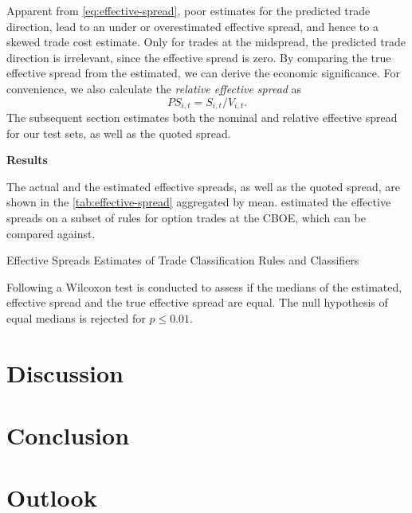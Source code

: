 Apparent from \cref{eq:effective-spread}, poor estimates for the predicted trade direction, lead to an under or overestimated effective spread, and hence to a skewed trade cost estimate. Only for trades at the midspread, the predicted trade direction is irrelevant, since the effective spread is zero. By comparing the true effective spread from the estimated, we can derive the economic significance. For convenience, we also calculate the \emph{relative effective spread} as
\begin{equation}
    {PS}_{i,t} = S_{i,t} / V_{i,t}.
\end{equation}
The subsequent section estimates both the nominal and relative effective spread for our test sets, as well as the quoted spread.

\textbf{Results}

The actual and the estimated effective spreads, as well as the quoted spread, are shown in the \cref{tab:effective-spread} aggregated by mean. \textcite[][896--897]{savickasInferringDirectionOption2003} estimated the effective spreads on a subset of rules for option trades at the \gls{CBOE}, which can be compared against.

\begin{table}[H]
    \centering
    
    \caption{Effective Spreads Estimates of Trade Classification Rules and Classifiers}
    \label{tab:effective-spread}
\end{table}

Following \textcite[][12]{theissenTestAccuracyLee2000} a Wilcoxon test is conducted to assess if the medians of the estimated, effective spread and the true effective spread are equal. The null hypothesis of equal medians is rejected for $p \leq 0.01$.



\newpage
\section{Discussion}\label{sec:discussion}

\newpage
\section{Conclusion}\label{sec:conclusion}

\newpage
\section{Outlook}\label{sec:outlook}

